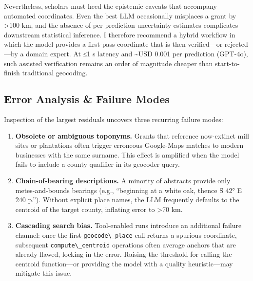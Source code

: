 Nevertheless, scholars must heed the epistemic caveats that accompany
automated coordinates. Even the best LLM occasionally misplaces a grant
by \textgreater100 km, and the absence of per-prediction uncertainty
estimates complicates downstream statistical inference. I therefore
recommend a hybrid workflow in which the model provides a first-pass
coordinate that is then verified---or rejected---by a domain expert. At
≤1 s latency and \textasciitilde USD 0.001 per prediction (GPT-4o), such
assisted verification remains an order of magnitude cheaper than
start-to-finish traditional geocoding.

\subsection{Error Analysis \& Failure
Modes}\label{error-analysis-failure-modes}

Inspection of the largest residuals uncovers three recurring failure
modes:

\begin{enumerate}
\def\labelenumi{\arabic{enumi}.}
\item
  \textbf{Obsolete or ambiguous toponyms.} Grants that reference
  now-extinct mill sites or plantations often trigger erroneous
  Google-Maps matches to modern businesses with the same surname. This
  effect is amplified when the model fails to include a county qualifier
  in its geocoder query.
\item
  \textbf{Chain-of-bearing descriptions.} A minority of abstracts
  provide only metes-and-bounds bearings (e.g., ``beginning at a white
  oak, thence S 42° E 240 p.''). Without explicit place names, the LLM
  frequently defaults to the centroid of the target county, inflating
  error to \textgreater70 km.
\item
  \textbf{Cascading search bias.} Tool-enabled runs introduce an
  additional failure channel: once the first
  \passthrough{\lstinline!geocode\_place!} call returns a spurious
  coordinate, subsequent \passthrough{\lstinline!compute\_centroid!}
  operations often average anchors that are already flawed, locking in
  the error. Raising the threshold for calling the centroid
  function---or providing the model with a quality heuristic---may
  mitigate this issue.
\end{enumerate}

